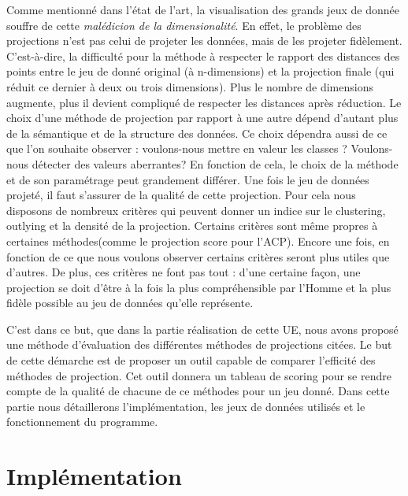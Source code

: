 Comme mentionné dans l’état de l’art, la visualisation des grands jeux de donnée souffre de cette \textit{malédicion de la dimensionalité}. En effet, le problème des projections n’est pas celui de projeter les données, mais de les projeter fidèlement. 
C’est-à-dire, la difficulté pour la méthode à respecter le rapport des distances des points entre le jeu de donné original (à n-dimensions) et la projection finale (qui réduit ce dernier à deux ou trois dimensions). 
Plus le nombre de dimensions augmente, plus il devient compliqué de respecter les distances après réduction. 
\newline
Le choix d’une méthode de projection par rapport à une autre dépend d'autant plus de la sémantique et de la structure des données. Ce choix dépendra aussi de ce que l’on souhaite observer : voulons-nous mettre en valeur les classes ? Voulons-nous détecter des valeurs aberrantes? 
En fonction de cela, le choix de la méthode et de son paramétrage peut grandement différer.
\smallskip
Une fois le jeu de données projeté, il faut s’assurer de la qualité de cette projection.
Pour cela nous disposons de nombreux critères qui peuvent donner un indice sur le clustering, outlying et la densité de la projection. Certains critères sont même propres à certaines méthodes(comme le projection score pour l'ACP).
Encore une fois, en fonction de ce que nous voulons observer certains critères seront plus utiles que d'autres. De plus, ces critères ne font pas tout : d’une certaine façon, une projection se doit d’être à la fois la plus compréhensible par l’Homme et la plus fidèle possible au jeu de données qu’elle représente.


\medskip
C'est dans ce but, que dans la partie réalisation de cette UE, nous avons proposé une méthode d'évaluation des différentes méthodes de projections citées.
Le but de cette démarche est de proposer un outil capable de comparer l'efficité des méthodes de projection. Cet outil donnera un tableau de scoring pour se rendre compte de la qualité de chacune de ce méthodes pour un jeu donné.
Dans cette partie nous détaillerons l'implémentation, les jeux de données utilisés et le fonctionnement du programme.
\medskip


\section{Implémentation}

